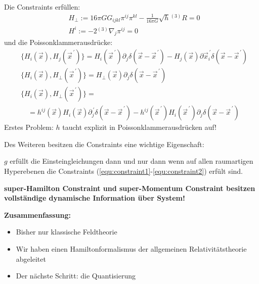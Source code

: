 \documentclass[mathserif]{beamer}
\newcommand{\inHS}{{}^{(3)}\!}
\theoremstyle{definition}
\begin{document}
	\begin{frame}
		Die Constraints erfüllen:
		\begin{align}
			&H_{\perp}:=16\pi G G_{ijkl}\pi^{ij}\pi^{kl}-\frac{1}{16\pi G}\sqrt{h}\inHS R=0 \label{equ:constraint1}\\
			&H^i:=-2\inHS\nabla_j\pi^{ij}=0 \label{equ:constraint2}
		\end{align}
		und die Poissonklammerausdrücke:
		\begin{align*}
			&\{H_i(\vec{x}),H_j(\vec{x}^{\,\prime})\}=H_i(\vec{x}^{\,\prime})\partial_j\delta(\vec{x}-\vec{x}^{\,\prime})-H_j(\vec{x})\partial\vec{x}^{\,\prime}_i\delta(\vec{x}-\vec{x}^{\,\prime})\\
			&\{H_i(\vec{x}),H_\perp(\vec{x}^{\,\prime})\}=H_\perp(\vec{x})\partial_j\delta(\vec{x}-\vec{x}^{\,\prime})\\
			&\{H_i(\vec{x}),H_\perp(\vec{x}^{\,\prime})\}=\\
			&\quad=h^{ij}(\vec{x})H_i(\vec{x})\partial^{\,\prime}_j\delta(\vec{x}-\vec{x}^{\,\prime})-h^{ij}(\vec{x}^{\,\prime})H_i(\vec{x}^{\,\prime})\partial_j\delta(\vec{x}-\vec{x}^{\,\prime})
		\end{align*}
		Erstes Problem: $h$ taucht explizit in Poissonklammerausdrücken auf!
	\end{frame}
	\begin{frame}
		Des Weiteren besitzen die Constraints eine wichtige Eigenschaft:
		\begin{theorem}
			$g$ erfüllt die Einsteingleichungen dann und nur dann wenn auf allen raumartigen Hyperebenen
			die Constraints (\ref{equ:constraint1}-\ref{equ:constraint2}) erfült sind.
		\end{theorem}
		\pause
		\begin{center}
			\textbf{super-Hamilton Constraint und super-Momentum Constraint besitzen vollständige dynamische Information über System!}
		\end{center}
	\end{frame}
	\begin{frame}
		\begin{center}
			\textbf{Zusammenfassung:}
		\end{center}
		\begin{itemize}
			\item Bisher nur klassische Feldtheorie
			\pause
			\item Wir haben einen Hamiltonformalismus der allgemeinen Relativitätstheorie abgeleitet
			\pause
			\item Der nächste Schritt: die Quantisierung
		\end{itemize}
	\end{frame}
\end{document}
